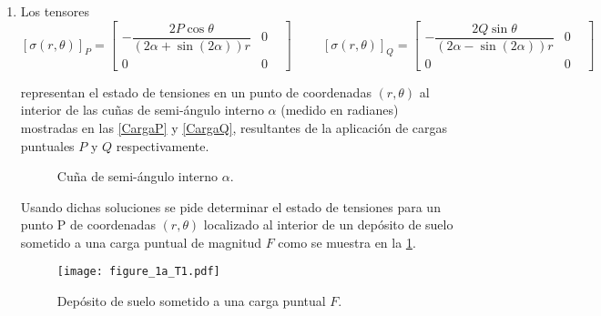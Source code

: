 \documentclass[../notas medios.tex]{subfiles}
\begin{document}
\begin{enumerate}
\item \label{punto23}  Los tensores
\[[\sigma(r,{\theta})]_P
 	= 
 	\begin{bmatrix}
     	-\dfrac{2P\cos\theta}{(2\alpha + \sin(2\alpha)) r} & 0 \;\;\;\\
     	0 & 0 \;\;\;
 	\end{bmatrix}
 	\hspace{1cm}
	[\sigma(r,{\theta})]_Q
 	= 
  	\begin{bmatrix}
     	-\dfrac{2Q\sin\theta}{(2\alpha - \sin(2\alpha)) r} & 0 \;\;\; \\
     	0 & 0 \;\;\;
 	\end{bmatrix}\]
 	
representan el estado de tensiones en un punto de coordenadas $(r, \theta)$ al interior de las cuñas de semi-ángulo interno $\alpha$ (medido en radianes) mostradas en las \cref{CargaP} y \cref{CargaQ}, resultantes de la aplicación de cargas puntuales $P$ y $Q$ respectivamente. 
\begin{figure}[H]
	\centering	
	\hspace{0.5cm}
	\caption{Cuña de semi-ángulo interno $\alpha$. }
\end{figure}

Usando dichas soluciones se pide determinar el estado de tensiones para un punto P de coordenadas $(r, \theta)$ localizado al interior de un depósito de suelo sometido a una carga puntual de magnitud $F$ como se muestra en la \cref{figure1}. 
%
\begin{figure}[h]
	\centering
		\texttt{[image: figure\_1a\_T1.pdf]} 		
	\caption{Depósito de suelo sometido a una carga puntual $F$.}
	\label{figure1}
\end{figure}
\end{enumerate}
\end{document}
